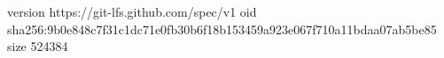 version https://git-lfs.github.com/spec/v1
oid sha256:9b0e848c7f31c1dc71e0fb30b6f18b153459a923e067f710a11bdaa07ab5be85
size 524384
